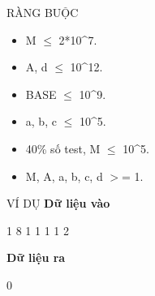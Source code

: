 RÀNG BUỘC  
\begin{itemize}
	\item     M  $\le$  2*10^7.   
	\item     A, d  $\le$  10^12.   
	\item     BASE  $\le$  10^9.   
	\item     a, b, c  $\le$  10^5.   
	\item     40\% số test, M  $\le$  10^5.   
	\item     M, A, a, b, c, d $>$= 1.   
\end{itemize}
   VÍ DỤ  
\textbf{    Dữ liệu vào   }

   1 8 1 1 1 1 2  

\textbf{    Dữ liệu ra   }

   0